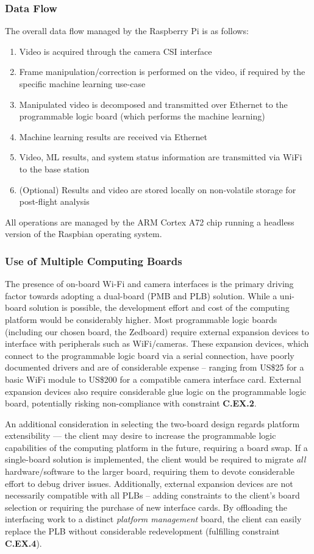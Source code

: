 \subsubsection{Data Flow}
The overall data flow managed by the Raspberry Pi is as follows:
\begin{enumerate}
\item Video is acquired through the camera CSI interface
\item Frame manipulation/correction is performed on the video, if required by the specific machine learning use-case
\item Manipulated video is decomposed and transmitted over Ethernet to the programmable logic board (which performs the machine learning)
\item Machine learning results are received via Ethernet
\item Video, ML results, and system status information are transmitted via WiFi to the base station
\item (Optional) Results and video are stored locally on non-volatile storage for post-flight analysis
\end{enumerate}

All operations are managed by the ARM Cortex A72 chip running a headless version of the Raspbian operating system. 

\subsubsection{Use of Multiple Computing Boards}
The presence of on-board Wi-Fi and camera interfaces is the primary driving factor towards adopting a dual-board (PMB and PLB) solution. While a uni-board solution is possible, the development effort and cost of the computing platform would be considerably higher. Most programmable logic boards (including our chosen board, the Zedboard) require external expansion devices to interface with peripherals such as WiFi/cameras. These expansion devices, which connect to the programmable logic board via a serial connection, have poorly documented drivers and are of considerable expense -- ranging from US\$25 for a basic WiFi module\cite{digiwifi} to US\$200 for a compatible camera interface card\cite{digipmod}. External expansion devices also require considerable glue logic on the programmable logic board, potentially risking non-compliance with constraint \textbf{C.EX.2}.

An additional consideration in selecting the two-board design regards platform extensibility --- the client may desire to increase the programmable logic capabilities of the computing platform in the future, requiring a board swap. If a single-board solution is implemented, the client would be required to migrate \textit{all} hardware/software to the larger board, requiring them to devote considerable effort to debug driver issues. Additionally, external expansion devices are not necessarily compatible with all PLBs -- adding constraints to the client's board selection or requiring the purchase of new interface cards. By offloading the interfacing work to a distinct \textit{platform management} board, the client can easily replace the PLB without considerable redevelopment (fulfilling constraint \textbf{C.EX.4}). 

